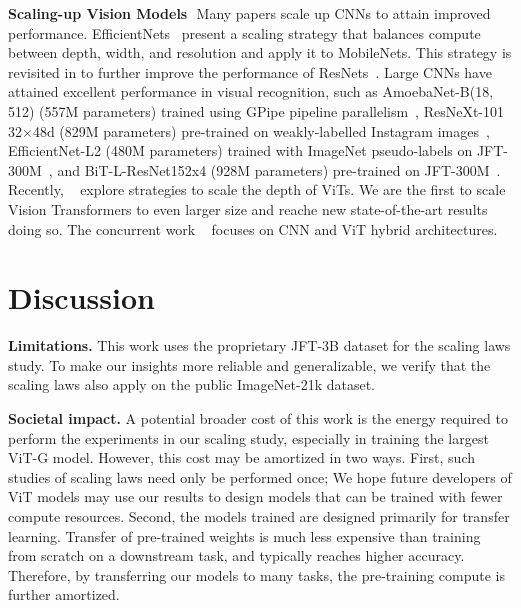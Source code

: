 \textbf{Scaling-up Vision Models\,\,}
Many papers scale up CNNs to attain improved performance.
EfficientNets~\cite{efficientnet,efficientnet_v2} present a scaling strategy that balances compute between depth, width, and resolution and apply it to MobileNets.
This strategy is revisited in \cite{bello2021revisiting,resnet_strikes} to further improve the performance of ResNets~\cite{he2016deep}.
Large CNNs have attained excellent performance in visual recognition, such as AmoebaNet-B(18, 512) (557M parameters) trained using GPipe pipeline parallelism~\cite{gpipe}, ResNeXt-101 32×48d (829M parameters) pre-trained on weakly-labelled Instagram images~\cite{instagram}, EfficientNet-L2 (480M parameters) trained with ImageNet pseudo-labels on JFT-300M~\cite{noisystudent}, and BiT-L-ResNet152x4 (928M parameters) pre-trained on JFT-300M~\cite{kolesnikov2019big}.
Recently, ~\cite{deepvit,cait} explore strategies to scale the depth of ViTs. 
We are the first to scale Vision Transformers to even larger size and reache new state-of-the-art results doing so.
The concurrent work ~\cite{coatnet} focuses on CNN and ViT hybrid architectures.
 

\section{Discussion}\label{sec:discussion}

\textbf{Limitations.} This work uses the proprietary JFT-3B dataset for the scaling laws study. To make our insights more reliable and generalizable, we verify that the scaling laws also apply on the public ImageNet-21k dataset. 

\textbf{Societal  impact.} A potential broader cost of this work is the energy required to perform the experiments in our scaling study, especially in training the largest ViT-G model.
However, this cost may be amortized in two ways.
First, such studies of scaling laws need only be performed once; We hope future developers of ViT models may use our results to design models that can be trained with fewer compute resources.
Second, the models trained are designed primarily for transfer learning.
Transfer of pre-trained weights is much less expensive than training from scratch on a downstream task, and typically reaches higher accuracy.
Therefore, by transferring our models to many tasks, the pre-training compute is further amortized.

